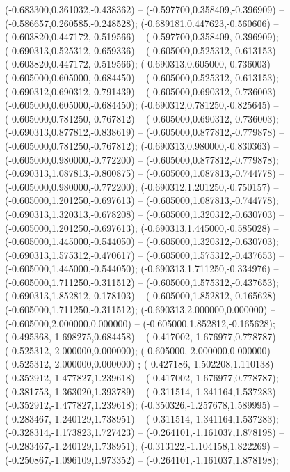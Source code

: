  (-0.683300,0.361032,-0.438362) -- (-0.597700,0.358409,-0.396909) -- (-0.586657,0.260585,-0.248528);
 (-0.689181,0.447623,-0.560606) -- (-0.603820,0.447172,-0.519566) -- (-0.597700,0.358409,-0.396909);
 (-0.690313,0.525312,-0.659336) -- (-0.605000,0.525312,-0.613153) -- (-0.603820,0.447172,-0.519566);
 (-0.690313,0.605000,-0.736003) -- (-0.605000,0.605000,-0.684450) -- (-0.605000,0.525312,-0.613153);
 (-0.690312,0.690312,-0.791439) -- (-0.605000,0.690312,-0.736003) -- (-0.605000,0.605000,-0.684450);
 (-0.690312,0.781250,-0.825645) -- (-0.605000,0.781250,-0.767812) -- (-0.605000,0.690312,-0.736003);
 (-0.690313,0.877812,-0.838619) -- (-0.605000,0.877812,-0.779878) -- (-0.605000,0.781250,-0.767812);
 (-0.690313,0.980000,-0.830363) -- (-0.605000,0.980000,-0.772200) -- (-0.605000,0.877812,-0.779878);
 (-0.690313,1.087813,-0.800875) -- (-0.605000,1.087813,-0.744778) -- (-0.605000,0.980000,-0.772200);
 (-0.690312,1.201250,-0.750157) -- (-0.605000,1.201250,-0.697613) -- (-0.605000,1.087813,-0.744778);
 (-0.690313,1.320313,-0.678208) -- (-0.605000,1.320312,-0.630703) -- (-0.605000,1.201250,-0.697613);
 (-0.690313,1.445000,-0.585028) -- (-0.605000,1.445000,-0.544050) -- (-0.605000,1.320312,-0.630703);
 (-0.690313,1.575312,-0.470617) -- (-0.605000,1.575312,-0.437653) -- (-0.605000,1.445000,-0.544050);
 (-0.690313,1.711250,-0.334976) -- (-0.605000,1.711250,-0.311512) -- (-0.605000,1.575312,-0.437653);
 (-0.690313,1.852812,-0.178103) -- (-0.605000,1.852812,-0.165628) -- (-0.605000,1.711250,-0.311512);
 (-0.690313,2.000000,0.000000) -- (-0.605000,2.000000,0.000000) -- (-0.605000,1.852812,-0.165628);
 (-0.495368,-1.698275,0.684458) -- (-0.417002,-1.676977,0.778787) -- (-0.525312,-2.000000,0.000000);
 (-0.605000,-2.000000,0.000000) -- (-0.525312,-2.000000,0.000000) ;
 (-0.427186,-1.502208,1.110138) -- (-0.352912,-1.477827,1.239618) -- (-0.417002,-1.676977,0.778787);
 (-0.381753,-1.363020,1.393789) -- (-0.311514,-1.341164,1.537283) -- (-0.352912,-1.477827,1.239618);
 (-0.350326,-1.257678,1.589995) -- (-0.283467,-1.240129,1.738951) -- (-0.311514,-1.341164,1.537283);
 (-0.328314,-1.173823,1.727423) -- (-0.264101,-1.161037,1.878198) -- (-0.283467,-1.240129,1.738951);
 (-0.313122,-1.104158,1.822269) -- (-0.250867,-1.096109,1.973352) -- (-0.264101,-1.161037,1.878198);
